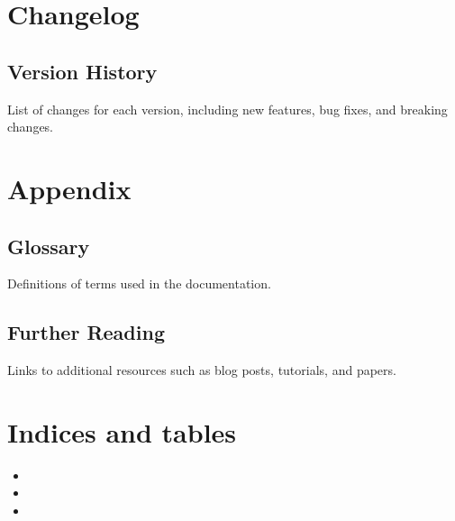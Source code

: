 \documentclass[letterpaper,10pt,english]{sphinxmanual}
\begin{document}
\chapter{Changelog}
\label{\detokenize{changelog:changelog}}\label{\detokenize{changelog::doc}}

\section{Version History}
\label{\detokenize{changelog:version-history}}
\sphinxAtStartPar
List of changes for each version, including new features, bug fixes, and breaking changes.

\sphinxstepscope


\chapter{Appendix}
\label{\detokenize{appendix:appendix}}\label{\detokenize{appendix::doc}}

\section{Glossary}
\label{\detokenize{appendix:glossary}}
\sphinxAtStartPar
Definitions of terms used in the documentation.


\section{Further Reading}
\label{\detokenize{appendix:further-reading}}
\sphinxAtStartPar
Links to additional resources such as blog posts, tutorials, and papers.


\chapter{Indices and tables}
\label{\detokenize{index:indices-and-tables}}\begin{itemize}
\item {} 
\sphinxAtStartPar
{}

\item {} 
\sphinxAtStartPar
{}

\item {} 
\sphinxAtStartPar
{}

\end{itemize}
\end{document}

